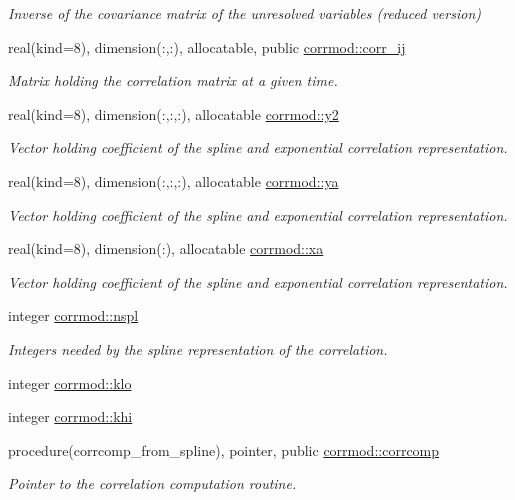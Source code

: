 \begin{DoxyCompactItemize}
\begin{DoxyCompactList}\small\item\em Inverse of the covariance matrix of the unresolved variables (reduced version) \end{DoxyCompactList}\item 
real(kind=8), dimension(\+:,\+:), allocatable, public \hyperlink{namespacecorrmod_ad9983e0594dec7351fe398f0f2225c6f}{corrmod\+::corr\+\_\+ij}
\begin{DoxyCompactList}\small\item\em Matrix holding the correlation matrix at a given time. \end{DoxyCompactList}\item 
real(kind=8), dimension(\+:,\+:,\+:), allocatable \hyperlink{namespacecorrmod_abd47fec6688f9997847712f6f44c7f08}{corrmod\+::y2}
\begin{DoxyCompactList}\small\item\em Vector holding coefficient of the spline and exponential correlation representation. \end{DoxyCompactList}\item 
real(kind=8), dimension(\+:,\+:,\+:), allocatable \hyperlink{namespacecorrmod_aae7d37a1064807c18f234f1c74d46afc}{corrmod\+::ya}
\begin{DoxyCompactList}\small\item\em Vector holding coefficient of the spline and exponential correlation representation. \end{DoxyCompactList}\item 
real(kind=8), dimension(\+:), allocatable \hyperlink{namespacecorrmod_a4af3bd2a2042f69a0fc89df8eba38de7}{corrmod\+::xa}
\begin{DoxyCompactList}\small\item\em Vector holding coefficient of the spline and exponential correlation representation. \end{DoxyCompactList}\item 
integer \hyperlink{namespacecorrmod_afec60f4bfbbc2a787462f2475348c4c2}{corrmod\+::nspl}
\begin{DoxyCompactList}\small\item\em Integers needed by the spline representation of the correlation. \end{DoxyCompactList}\item 
integer \hyperlink{namespacecorrmod_a25e22cc2633ad68b74ebc21589957554}{corrmod\+::klo}
\item 
integer \hyperlink{namespacecorrmod_ac3bac71aa78c9e05401de3680f0c4ffc}{corrmod\+::khi}
\item 
procedure(corrcomp\+\_\+from\+\_\+spline), pointer, public \hyperlink{namespacecorrmod_ad42bfc9c0ec2cf55958a45b46839d856}{corrmod\+::corrcomp}
\begin{DoxyCompactList}\small\item\em Pointer to the correlation computation routine. \end{DoxyCompactList}\end{DoxyCompactItemize}
